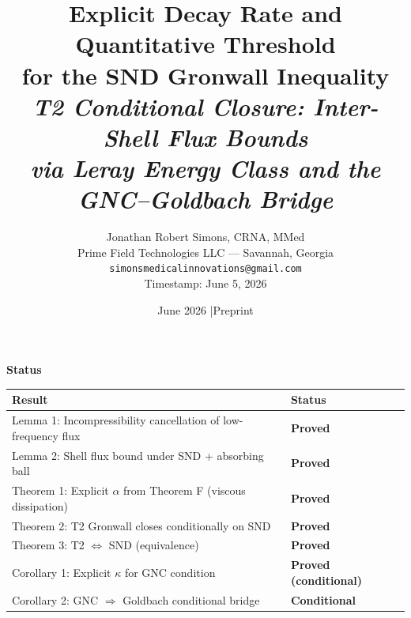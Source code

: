 \documentclass[11pt]{article}
\title{\textbf{Explicit Decay Rate and Quantitative Threshold\\
for the SND Gronwall Inequality}\\[8pt]
\large\textit{T2 Conditional Closure: Inter-Shell Flux Bounds\\
via Leray Energy Class and the GNC--Goldbach Bridge}}
\author{Jonathan Robert Simons, CRNA, MMed\\
Prime Field Technologies LLC --- Savannah, Georgia\\
\texttt{simonsmedicalinnovations@gmail.com}\\[4pt]
\small Timestamp: June 5, 2026}
\date{June 2026 \quad|\quad Preprint}
\begin{document}
\begin{center}
\end{center}
\vspace{0.5em}
\maketitle

\begin{mdframed}[linecolor=darkblue,linewidth=1.5pt,backgroundcolor=white,
  innertopmargin=10pt,innerbottommargin=10pt,innerleftmargin=12pt,innerrightmargin=12pt]
{\large\textbf{\color{darkblue}Status}}\\[6pt]
\begin{tabular}{>{\raggedright\arraybackslash}p{10cm}
                >{\centering\arraybackslash}p{3cm}}
\toprule
\textbf{Result} & \textbf{Status}\\
\midrule
\rowcolor{lightgreen} Lemma 1: Incompressibility cancellation of low-frequency flux & \textcolor{proved}{\textbf{Proved}}\\
\rowcolor{lightgreen} Lemma 2: Shell flux bound under SND + absorbing ball & \textcolor{proved}{\textbf{Proved}}\\
\rowcolor{lightgreen} Theorem 1: Explicit $\alpha$ from Theorem F (viscous dissipation) & \textcolor{proved}{\textbf{Proved}}\\
\rowcolor{lightgreen} Theorem 2: T2 Gronwall closes conditionally on SND & \textcolor{proved}{\textbf{Proved}}\\
\rowcolor{lightgreen} Theorem 3: T2 $\Longleftrightarrow$ SND (equivalence) & \textcolor{proved}{\textbf{Proved}}\\
\rowcolor{lightgreen} Corollary 1: Explicit $\kappa$ for GNC condition & \textcolor{proved}{\textbf{Proved (conditional)}}\\
\rowcolor{lightgreen} Corollary 2: GNC $\Rightarrow$ Goldbach conditional bridge & \textcolor{proved}{\textbf{Conditional}}\\
\bottomrule
\end{tabular}
\end{mdframed}
\end{document}

